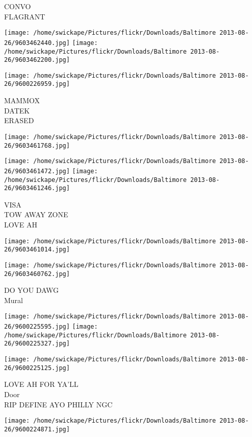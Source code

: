 \documentclass[10pt,letterpaper]{article}
\begin{document}
CONVO\\
FLAGRANT
\pagebreak

\texttt{[image: /home/swickape/Pictures/flickr/Downloads/Baltimore 2013-08-26/9603462440.jpg]}
\texttt{[image: /home/swickape/Pictures/flickr/Downloads/Baltimore 2013-08-26/9603462200.jpg]}

\texttt{[image: /home/swickape/Pictures/flickr/Downloads/Baltimore 2013-08-26/9600226959.jpg]}

MAMMOX\\
DATEK\\
ERASED
\pagebreak

\texttt{[image: /home/swickape/Pictures/flickr/Downloads/Baltimore 2013-08-26/9603461768.jpg]}

\vspace{0.25in}
\texttt{[image: /home/swickape/Pictures/flickr/Downloads/Baltimore 2013-08-26/9603461472.jpg]}
\texttt{[image: /home/swickape/Pictures/flickr/Downloads/Baltimore 2013-08-26/9603461246.jpg]}

VISA\\
TOW AWAY ZONE\\
LOVE AH
\pagebreak

\texttt{[image: /home/swickape/Pictures/flickr/Downloads/Baltimore 2013-08-26/9603461014.jpg]}

\vspace{0.25in}
\texttt{[image: /home/swickape/Pictures/flickr/Downloads/Baltimore 2013-08-26/9603460762.jpg]}

DO YOU DAWG\\
Mural
\pagebreak

\texttt{[image: /home/swickape/Pictures/flickr/Downloads/Baltimore 2013-08-26/9600225595.jpg]}
\texttt{[image: /home/swickape/Pictures/flickr/Downloads/Baltimore 2013-08-26/9600225327.jpg]}

\vspace{0.25in}
\texttt{[image: /home/swickape/Pictures/flickr/Downloads/Baltimore 2013-08-26/9600225125.jpg]}

LOVE AH FOR YA'LL\\
Door\\
RIP DEFINE AYO PHILLY NGC
\pagebreak

\texttt{[image: /home/swickape/Pictures/flickr/Downloads/Baltimore 2013-08-26/9600224871.jpg]}
\end{document}
